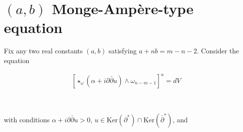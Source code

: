 \documentclass[10pt,a4paper]{amsart}
\newcommand{\spartial}{\partial^*}
\newcommand{\pbp}{\partial \bar{\partial}}
\newcommand{\Ker}{\mbox{Ker}}
\newtheorem{proposition}[theorem]{Proposition}
\numberwithin{equation}{section}
\begin{document}













\section{$(a,b)$ Monge-Amp\`ere-type equation}\label{section3}

\bigskip


 Fix any two real constants $(a,b)$ satisfying $a+ nb = m-n-2$. Consider the equation

\begin{equation} \label{(n-1)-MAeqn}
    \begin{aligned}
        \left[\star_{\omega}(\alpha + i\pbp u) \wedge \omega_{n-m-1}\right]^n = dV
    \end{aligned}
\end{equation}

\


\noindent with conditions $\alpha + i\pbp u >0$, $u \in \Ker (\spartial) \cap \Ker( \bar{\partial}^*)$, and 
\end{document}

